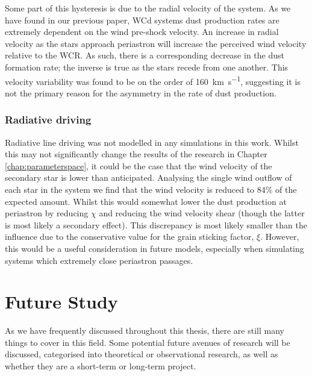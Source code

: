 Some part of this hysteresis is due to the radial velocity of the system.
As we have found in our previous paper, WCd systems dust production rates are extremely dependent on the wind pre-shock velocity.
An increase in radial velocity as the stars approach periastron will increase the perceived wind velocity relative to the WCR.
As such, there is a corresponding decrease in the dust formation rate; the inverse is true as the stars recede from one another.
This velocity variability was found to be on the order of \SI{160}{km.s^{-1}}, suggesting it is not the primary reason for the asymmetry in the rate of dust production.


\subsubsection{Radiative driving}

Radiative line driving was not modelled in any simulations in this work.
Whilst this may not significantly change the results of the research in Chapter \ref{chap:parameterspace}, it could be the case that the wind velocity of the secondary star is lower than anticipated.
Analysing the single wind outflow of each star in the system we find that the wind velocity is reduced to 84\% of the expected amount.
Whilst this would somewhat lower the dust production at periastron by reducing $\chi$ and reducing the wind velocity shear (though the latter is most likely a secondary effect).
This discrepancy is most likely smaller than the influence due to the conservative value for the grain sticking factor, $\xi$.
However, this would be a useful consideration in future models, especially when simulating systems which extremely close periastron passages.

\section{Future Study}

As we have frequently discussed throughout this thesis, there are still many things to cover in this field.
Some potential future avenues of research will be discussed, categorised into theoretical or observational research, as well as whether they are a short-term or long-term project.

